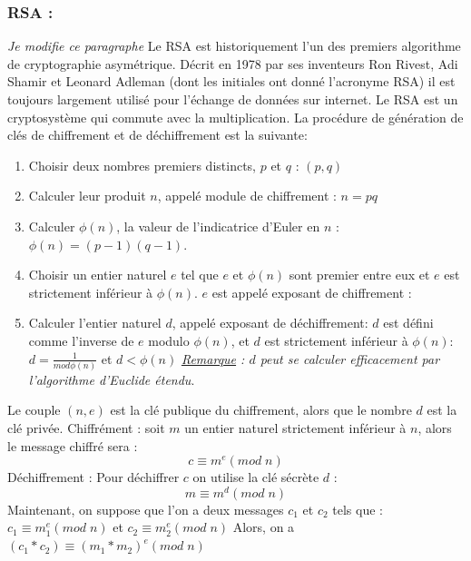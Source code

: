 \documentclass[a4paper,11pt]{report}
\begin{document}
\subsubsection{RSA :}\textit{Je modifie ce paragraphe}
Le RSA est historiquement l'un des premiers  algorithme de cryptographie asymétrique. Décrit en 1978 par ses inventeurs Ron Rivest, Adi Shamir et Leonard Adleman (dont les initiales ont donné l'acronyme RSA) il est toujours largement utilisé pour l'échange de données sur internet. Le RSA est un cryptosystème qui commute avec la multiplication.\newline
La procédure de génération de clés de chiffrement et de déchiffrement est la suivante:
\begin{enumerate}
\item Choisir deux nombres premiers distincts,  $p$ et $q$ : $(p,q)$
\item Calculer leur produit $n$, appelé module de chiffrement : $n = pq$
\item Calculer $\phi(n)$, la valeur de l'indicatrice d'Euler en $n$ : $\phi(n) = (p - 1)(q -1)$.
\item Choisir un entier naturel $e$ tel que $e$ et $\phi(n)$ sont  premier entre eux et $e$ est strictement inférieur à $\phi(n)$. $e$ est appelé exposant de chiffrement :
\item Calculer l'entier naturel $d$, appelé exposant de déchiffrement:
  $d$ est défini comme l'inverse de $e$ modulo $\phi(n)$, et $d$ est strictement inférieur à $\phi(n)$:
$d=\frac{1}{mod\phi(n)}$ et $d<\phi(n)$
  \textit{\underline{Remarque} : $d$ peut se calculer efficacement par l'algorithme d'Euclide étendu}.
\end{enumerate}
Le couple $(n,e)$ est la clé publique du chiffrement, alors que le nombre $d$ est la clé privée.\newline
Chiffrément :\newline 
soit $m$ un entier naturel strictement inférieur à $n$, alors le message chiffré sera :\newline
$$c \equiv m^e(mod\; n)$$
Déchiffrement :\newline
Pour déchiffrer $c$ on utilise la clé sécrète $d$ :\newline
$$m \equiv m^d(mod\; n)$$
Maintenant, on suppose que l'on a deux messages $c_1$ et $c_2$ tels que :
$c_1 \equiv m_1^e(mod\; n)$ et $c_2 \equiv m_2^e(mod\; n)$ \newline
Alors, on a $(c_1*c_2) \equiv (m_1*m_2)^e(mod\; n)$\newline
\newline
\end{document}
